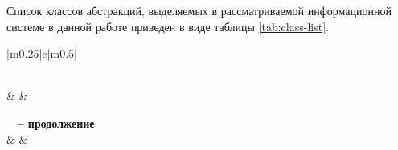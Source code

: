 \documentclass[a4paper,14pt]{extarticle}
\begin{document}
Список классов абстракций, выделяемых в рассматриваемой информационной системе в данной работе приведен в виде таблицы \ref{tab:class-list}.
\small

\begin{longtable}{|m{0.25\linewidth}|c|m{0.5\linewidth}|}
	\caption{Список классов анализа системы} \label{tab:class-list}\\
	
	\hline {} &  &  \\ 
	\hline \hline \endfirsthead
	
	{{\bfseries \tablename\ \thetable{} -- продолжение}} \\
	\hline {} &  &  \\ 
	\hline \hline \endhead
	
	\hline {} \\
	\endfoot
	
	\endlastfoot
	

\end{longtable}
\end{document}
